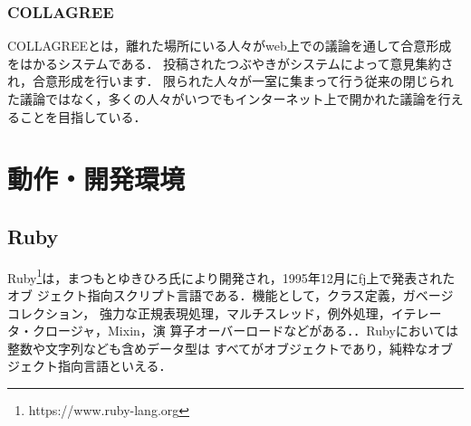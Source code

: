 \subsubsection{COLLAGREE}
COLLAGREE\cite{ito2016}とは，離れた場所にいる人々がweb上での議論を通して合意形成をはかるシステムである．
投稿されたつぶやきがシステムによって意見集約され，合意形成を行います．
限られた人々が一室に集まって行う従来の閉じられた議論ではなく，多くの人々がいつでもインターネット上で開かれた議論を行えることを目指している．

\section{動作・開発環境}

\subsection{Ruby}
Ruby\footnote{https://www.ruby-lang.org}は，まつもとゆきひろ氏により開発され，1995年12月にfj上で発表されたオブ
ジェクト指向スクリプト言語である．機能として，クラス定義，ガベージコレクション，
強力な正規表現処理，マルチスレッド，例外処理，イテレータ・クロージャ，Mixin，演
算子オーバーロードなどがある．．Rubyにおいては整数や文字列なども含めデータ型は
すべてがオブジェクトであり，純粋なオブジェクト指向言語といえる．

